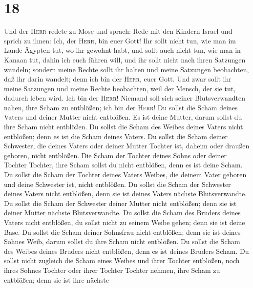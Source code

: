 \hypertarget{section-17}{%
\section{18}\label{section-17}}

 Und der \textsc{Herr} redete zu Mose und sprach: Rede mit
den Kindern Israel und sprich zu ihnen:  Ich, der
\textsc{Herr}, bin euer Gott!  Ihr sollt nicht tun, wie
man im Lande Ägypten tut, wo ihr gewohnt habt, und sollt auch nicht tun,
wie man in Kanaan tut, dahin ich euch führen will, und ihr sollt nicht
nach ihren Satzungen wandeln;  sondern meine Rechte sollt
ihr halten und meine Satzungen beobachten, daß ihr darin wandelt; denn
ich bin der \textsc{Herr}, euer Gott.  Und zwar sollt ihr
meine Satzungen und meine Rechte beobachten, weil der Mensch, der sie
tut, dadurch leben wird. Ich bin der \textsc{Herr}! 
Niemand soll sich seiner Blutsverwandten nahen, ihre Scham zu entblößen;
ich bin der \textsc{Herr}!  Du sollst die Scham deines
Vaters und deiner Mutter nicht entblößen. Es ist deine Mutter, darum
sollst du ihre Scham nicht entblößen.  Du sollst die Scham
des Weibes deines Vaters nicht entblößen; denn es ist die Scham deines
Vaters.  Du sollst die Scham deiner Schwester, die deines
Vaters oder deiner Mutter Tochter ist, daheim oder draußen geboren,
nicht entblößen.  Die Scham der Tochter deines Sohns oder
deiner Tochter Tochter, ihre Scham sollst du nicht entblößen, denn es
ist deine Scham.  Du sollst die Scham der Tochter deines
Vaters Weibes, die deinem Vater geboren und deine Schwester ist, nicht
entblößen.  Du sollst die Scham der Schwester deines
Vaters nicht entblößen, denn sie ist deines Vaters nächste
Blutsverwandte.  Du sollst die Scham der Schwester deiner
Mutter nicht entblößen; denn sie ist deiner Mutter nächste
Blutsverwandte.  Du sollst die Scham des Bruders deines
Vaters nicht entblößen, du sollst nicht zu seinem Weibe gehen; denn sie
ist deine Base.  Du sollst die Scham deiner Sohnsfrau
nicht entblößen; denn sie ist deines Sohnes Weib, darum sollst du ihre
Scham nicht entblößen.  Du sollst die Scham des Weibes
deines Bruders nicht entblößen, denn es ist deines Bruders Scham.
 Du sollst nicht zugleich die Scham eines Weibes und
ihrer Tochter entblößen, noch ihres Sohnes Tochter oder ihrer Tochter
Tochter nehmen, ihre Scham zu entblößen; denn sie ist ihre nächste
